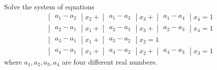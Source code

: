 \item Solve the system of equations
\begin{align*}
\begin{vmatrix} a_1-a_2 \end{vmatrix} x_2 +\begin{vmatrix} a_1-a_3 \end{vmatrix} x_3 +\begin{vmatrix} a_1-a_4 \end{vmatrix} x_4 = 1\\
\begin{vmatrix} a_2-a_1 \end{vmatrix} x_1 +\begin{vmatrix} a_2-a_3 \end{vmatrix} x_3 +\begin{vmatrix} a_2-a_3 \end{vmatrix} x_4 = 1\\
\begin{vmatrix} a_3-a_1 \end{vmatrix} x_1 +\begin{vmatrix} a_3-a_2 \end{vmatrix} x_2 = 1\\
\begin{vmatrix} a_4-a_1 \end{vmatrix} x_1 +\begin{vmatrix} a_4-a_2 \end{vmatrix} x_2 +\begin{vmatrix} a_4-a_3 \end{vmatrix} x_3 = 1
\end{align*}
where $a_1, a_2, a_3, a_4$ are four different real numbers.



